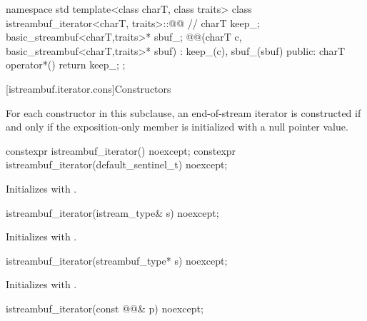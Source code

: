 %
\begin{codeblock}
namespace std {
  template<class charT, class traits>
  class istreambuf_iterator<charT, traits>::@@ { // \expos
    charT keep_;
    basic_streambuf<charT,traits>* sbuf_;
    @@(charT c, basic_streambuf<charT,traits>* sbuf)
      : keep_(c), sbuf_(sbuf) { }
  public:
    charT operator*() { return keep_; }
  };
}
\end{codeblock}

[istreambuf.iterator.cons]{Constructors}

\pnum
For each  constructor in this subclause,
an end-of-stream iterator is constructed if and only if
the exposition-only member  is initialized with a null pointer value.


%
\begin{itemdecl}
constexpr istreambuf_iterator() noexcept;
constexpr istreambuf_iterator(default_sentinel_t) noexcept;
\end{itemdecl}

\begin{itemdescr}
\pnum
\effects
Initializes  with .
\end{itemdescr}


%
\begin{itemdecl}
istreambuf_iterator(istream_type& s) noexcept;
\end{itemdecl}

\begin{itemdescr}
\pnum
\effects
Initializes  with .
\end{itemdescr}


%
\begin{itemdecl}
istreambuf_iterator(streambuf_type* s) noexcept;
\end{itemdecl}

\begin{itemdescr}
\pnum
\effects
Initializes  with .
\end{itemdescr}


%
\begin{itemdecl}
istreambuf_iterator(const @@& p) noexcept;
\end{itemdecl}

